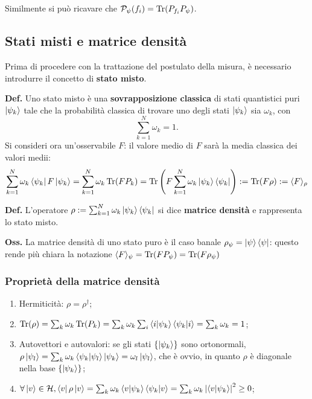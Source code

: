 Similmente si può ricavare che $\mathcal{P}_{\psi}(f_i) = \Tr(P_{f_i}P_{\psi})$.

\subsection{Stati misti e matrice densità}
Prima di procedere con la trattazione del postulato della misura, è necessario introdurre il concetto
di \textbf{stato misto}.

\textbf{Def.} Uno stato misto è una \textbf{sovrapposizione classica} di stati quantistici puri
$\ket{\psi_k}$ tale che la probabilità classica di trovare uno degli stati $\ket{\psi_k}$ sia $\omega_k$,
con
$$
\sum_{k=1}^{N}\omega_k=1.
$$
Si consideri ora un'osservabile $F$: il valore medio di $F$ sarà la media classica dei valori medii:
$$ \sum_{k=1}^{N} \omega_k \bra{\psi_k}F\ket{\psi_k} = \sum_{k=1}^{N}\omega_k \Tr(FP_k) =
\Tr\left(F \sum_{k=1}^{N} \omega_k \ket{\psi_k}\bra{\psi_k}\right) := \Tr(F\rho):=\langle F\rangle_\rho$$

\textbf{Def.} L'operatore $\rho :=\sum_{k=1}^{N}\omega_k\ket{\psi_k}\bra{\psi_k}$ si dice \textbf{matrice
densità} e rappresenta lo stato misto.

\textbf{Oss.} La matrice densità di uno stato puro è il caso banale $\rho_\psi = \ket{\psi}\bra{\psi}$:
questo rende più chiara la notazione $\langle F\rangle_\psi = \Tr(FP_\psi) = \Tr(F\rho_\psi)$

\subsubsection{Proprietà della matrice densità}
\begin{enumerate}
    \item Hermiticità: $\rho = \rho^{\dagger}$;
    \item $\Tr(\rho) = \sum_{k}^{}\omega_k \Tr(P_k) =
	\sum_{k}^{}\omega_k\sum_{i}^{}\bra{i}\ket{\psi_k}\bra{\psi_k}\ket{i} = \sum_{k}^{}\omega_k  = 1$;
    \item Autovettori e autovalori: se gli stati $\left\{\ket{\psi_k}\right\}$ sono ortonormali,
	$\rho\ket{\psi_l}=\sum_{k}^{}\omega_k\bra{\psi_k}\ket{\psi_l}\ket{\psi_k} = \omega_l\ket{\psi_l}$,
	che è ovvio, in quanto $\rho$ è diagonale nella base $\left\{\ket{\psi_k}\right\}$;
    \item $\forall \ket{v}\in\mathcal{H}, \bra{v}\rho\ket{v}
	= \sum_{k}^{} \omega_k \bra{v}\ket{\psi_k}\bra{\psi_k}\ket{v}
	= \sum_{k}^{} \omega_k \left|\bra{v}\ket{\psi_k} \right|^2 \geq 0$;
\end{enumerate}

